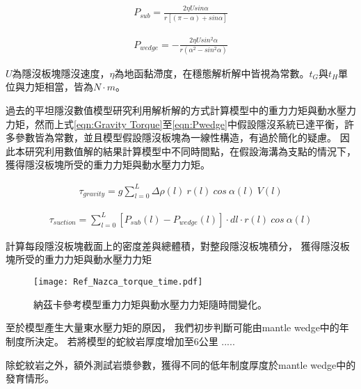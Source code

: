 \begin{align}
    P_{sub}=\frac{2 \eta U sin \alpha}{r[(\pi - \alpha)+sin\alpha]}
    \label{eqn:Psub}
\end{align}

\begin{align}
    P_{wedge}=-\frac{2 \eta U sin^{2} \alpha}{r(\alpha^2-sin^2\alpha)}
    \label{eqn:Pwedge}
\end{align}

$U$為隱沒板塊隱沒速度，$\eta$為地函黏滯度，在穩態解析解中皆視為常數。$t_G$與$t_H$單位與力矩相當，皆為$N\cdot m$。

過去的平坦隱沒數值模型研究利用解析解的方式計算模型中的重力力矩與動水壓力力矩，然而上式\ref{eqn:Gravity Torque}至\ref{eqn:Pwedge}中假設隱沒系統已達平衡，許多參數皆為常數，並且模型假設隱沒板塊為一線性構造，有過於簡化的疑慮。
因此本研究利用數值解的結果計算模型中不同時間點，在假設海溝為支點的情況下，獲得隱沒板塊所受的重力力矩與動水壓力力矩。

\begin{align}
    \tau_{gravity} =  g\sum ^L_{l=0} \Delta \rho(l)\ r(l)\ cos\ \alpha (l)\ V(l) 
    \label{eqn:}
\end{align}

\begin{align}
    \tau_{suction} =  \sum ^L_{l=0} [P_{sub}(l)-P_{wedge}(l)]\cdot dl\cdot r(l)\ cos\ \alpha (l)
    \label{eqn:}
\end{align}

計算每段隱沒板塊截面上的密度差與總體積，對整段隱沒板塊積分，
獲得隱沒板塊所受的重力力矩與動水壓力力矩



\begin{figure*}[hb]
    \centering
    \texttt{[image: Ref\_Nazca\_torque\_time.pdf]}
    \caption[納茲卡參考模型重力力矩與動水壓力力矩隨時間變化]{納茲卡參考模型重力力矩與動水壓力力矩隨時間變化。}
    \label{fig::Nazca_Ref_torque_time}
\end{figure*}

至於模型產生大量東水壓力矩的原因，
我們初步判斷可能由mantle wedge中的年制度所決定。
若將模型的蛇紋岩厚度增加至6公里
.....




除蛇紋岩之外，額外測試岩漿參數，獲得不同的低年制度厚度於mantle wedge中的發育情形。

